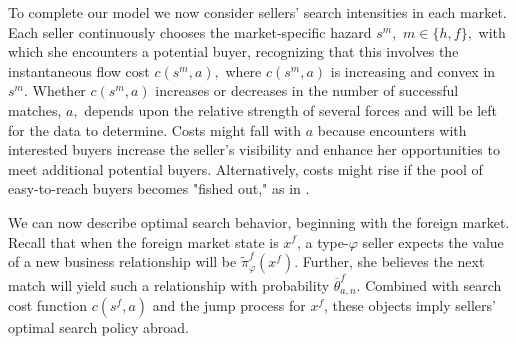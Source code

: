 \documentclass[12pt,titlepage]{article}
\begin{document}
To complete our model we now consider sellers' search intensities in each
market. Each seller continuously chooses the market-specific hazard $s^{m},$ 
$m\in \{h,f\},$ with which she encounters a potential buyer, recognizing
that this involves the instantaneous flow cost $c(s^{m},a),$ where $%
c(s^{m},a)$ is increasing and convex in $s^{m}.$\footnotemark{} Whether $c(s^{m},a)$ increases or decreases in the number of
successful matches, $a,$ depends upon the relative strength of several
forces and will be left for the data to determine. Costs might fall with $a$
because encounters with interested buyers increase the seller's visibility
and enhance her opportunities to meet additional potential buyers.
Alternatively, costs might rise if the pool of easy-to-reach buyers becomes
"fished out," as in \citet{arkolakis2010market}.

We can now describe optimal search behavior, beginning with the foreign
market. Recall that when the foreign market state is $x^{f}$, a type-$%
\varphi $ seller expects the value of a new business relationship will be $%
\widetilde{\pi }_{\varphi }^{f}(x^{f}).$ Further, she believes the next
match will yield such a relationship with probability $\overline{\theta }%
_{a,n}^{f}$. Combined with search cost function $c(s^{f},a)$ and the jump
process for $x^{f}$, these objects imply sellers' optimal search policy
abroad.
\end{document}
